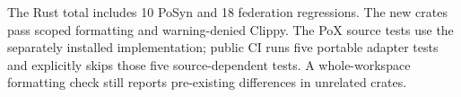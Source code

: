 The Rust total includes 10 PoSyn and 18 federation regressions. The new crates
pass scoped formatting and warning-denied Clippy. The PoX source tests use the
separately installed implementation; public CI runs five portable adapter tests
and explicitly skips those five source-dependent tests. A whole-workspace
formatting check still reports pre-existing differences in unrelated crates.
